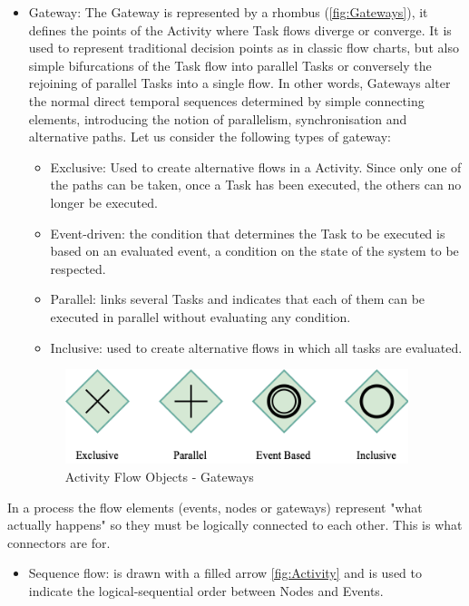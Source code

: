 \begin{itemize}
    \item Gateway: The Gateway is represented by a rhombus (\autoref{fig:Gateways}), it defines the points of the Activity where Task flows diverge or converge. It is used to represent traditional decision points as in classic flow charts, but also simple bifurcations of the Task flow into parallel Tasks or conversely the rejoining of parallel Tasks into a single flow. In other words, Gateways alter the normal direct temporal sequences determined by simple connecting elements, introducing the notion of parallelism, synchronisation and alternative paths. Let us consider the following types of gateway:
    \begin{itemize}
        \item Exclusive: Used to create alternative flows in a Activity. Since only one of the paths can be taken, once a Task has been executed, the others can no longer be executed.
        \item Event-driven: the condition that determines the Task to be executed is based on an evaluated event, a condition on the state of the system to be respected.
        \item Parallel: links several Tasks and indicates that each of them can be executed in parallel without evaluating any condition.
        \item Inclusive: used to create alternative flows in which all tasks are evaluated.
    \end{itemize}
    \begin{figure}[H]
	\centering
	\includegraphics[width=10cm]{Figures/Conceptual Model/Gateways.png}
	\caption{Activity Flow Objects - Gateways}
	\label{fig:Gateways}
    \end{figure}
    
\end{itemize}
In a process the flow elements (events, nodes or gateways) represent "what actually happens" so they must be logically connected to each other. This is what connectors are for. 

\begin{itemize}
    \item Sequence flow: is drawn with a filled arrow \autoref{fig:Activity} and is used to indicate the logical-sequential order between Nodes and Events. 
\end{itemize}
